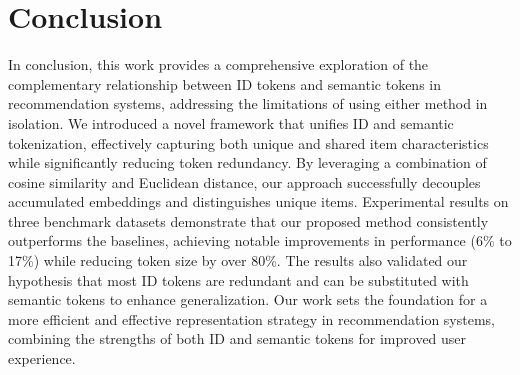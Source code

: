 \section{Conclusion}
In conclusion, this work provides a comprehensive exploration of the complementary relationship between ID tokens and semantic tokens in recommendation systems, addressing the limitations of using either method in isolation. We introduced a novel framework that unifies ID and semantic tokenization, effectively capturing both unique and shared item characteristics while significantly reducing token redundancy. By leveraging a combination of cosine similarity and Euclidean distance, our approach successfully decouples accumulated embeddings and distinguishes unique items. Experimental results on three benchmark datasets demonstrate that our proposed method consistently outperforms the baselines, achieving notable improvements in performance (6\% to 17\%) while reducing token size by over 80\%. The results also validated our hypothesis that most ID tokens are redundant and can be substituted with semantic tokens to enhance generalization. Our work sets the foundation for a more efficient and effective representation strategy in recommendation systems, combining the strengths of both ID and semantic tokens for improved user experience.